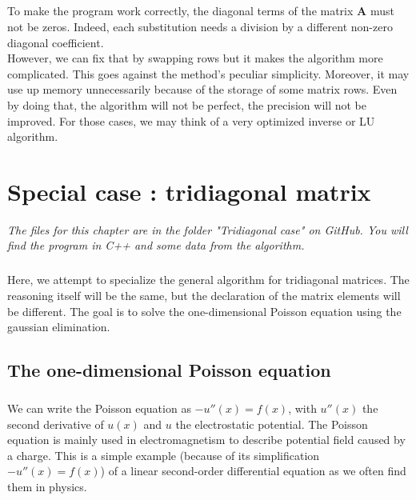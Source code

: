 \documentclass[a4paper, twoside, 11pt]{report}
\theoremstyle{theorem}
\theoremstyle{remark}
\theoremstyle{exemple}
\begin{document}
	\paragraph{}To make the program work correctly, the diagonal terms of the matrix $\mathbf{A}$ must not be zeros. Indeed, each substitution needs a division by a different non-zero diagonal coefficient.
	\\However, we can fix that by swapping rows but it makes the algorithm more complicated. This goes against the method's peculiar simplicity. Moreover, it may use up memory unnecessarily because of the storage of some matrix rows. Even by doing that, the algorithm will not be perfect, the precision will not be improved. For those cases, we may think of a very optimized inverse or LU algorithm. 
	
	
\chapter{Special case : tridiagonal matrix}

\footnotesize{\itshape{The files for this chapter are in the folder "Tridiagonal case" on GitHub. You will find the program in C++ and some data from the algorithm.}}

\normalsize

	\paragraph{} Here, we attempt to specialize the general algorithm for tridiagonal matrices. The reasoning itself will be the same, but the declaration of the matrix elements will be different. The goal is to solve the one-dimensional Poisson equation using the gaussian elimination. 
	
	\section{The one-dimensional Poisson equation}
	\paragraph{} We can write the Poisson equation as $-u''(x)=f(x)$, with $u''(x)$ the second derivative of $u(x)$ and $u$ the electrostatic potential. The Poisson equation is mainly used in electromagnetism to describe potential field caused by a charge. This is a simple example (because of its simplification $-u''(x)=f(x)$) of a linear second-order differential equation as we often find them in physics. 
	
\end{document}
